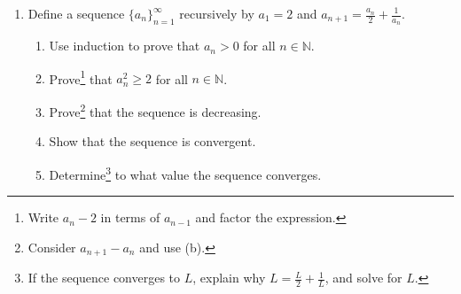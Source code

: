 \documentclass[12pt]{amsart}
\newcommand{\N}{\mathbb{N}}
\begin{document}
\begin{enumerate}


\item Define a sequence $\{a_n\}_{n=1}^\infty$ recursively by $a_1=2$ and $\displaystyle a_{n+1} = \frac{a_{n}}{2} + \frac{1}{a_{n}}$.
\begin{enumerate}
\item Use induction to prove that $a_n>0$ for all $n\in \N$.
\item Prove\footnote{Write $a_{n}-2$ in terms of $a_{n-1}$ and factor the expression.} that $a_n^2 \geq 2$ for all $n\in \N$.
\item Prove\footnote{Consider $a_{n+1}-a_n$ and use (b).} that the sequence is decreasing.
\item Show that the sequence is convergent.
\item Determine\footnote{If the sequence converges to $L$, explain why $L = \frac{L}{2} + \frac{1}{L}$, and solve for $L$.} to what value the sequence converges.
\end{enumerate}





\end{enumerate}
\end{document}
